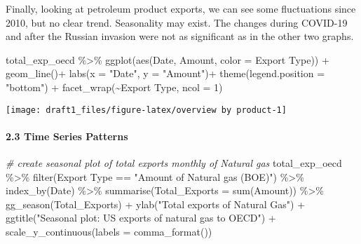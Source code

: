 \documentclass[
]{article}
\newenvironment{Shaded}{\begin{snugshade}}{\end{snugshade}}
\newcommand{\AttributeTok}[1]{\textcolor[rgb]{0.77,0.63,0.00}{#1}}
\newcommand{\CommentTok}[1]{\textcolor[rgb]{0.56,0.35,0.01}{\textit{#1}}}
\newcommand{\DecValTok}[1]{\textcolor[rgb]{0.00,0.00,0.81}{#1}}
\newcommand{\FunctionTok}[1]{\textcolor[rgb]{0.00,0.00,0.00}{#1}}
\newcommand{\NormalTok}[1]{#1}
\newcommand{\SpecialCharTok}[1]{\textcolor[rgb]{0.00,0.00,0.00}{#1}}
\newcommand{\StringTok}[1]{\textcolor[rgb]{0.31,0.60,0.02}{#1}}
\begin{document}
Finally, looking at petroleum product exports, we can see some
fluctuations since 2010, but no clear trend. Seasonality may exist. The
changes during COVID-19 and after the Russian invasion were not as
significant as in the other two graphs.

\begin{Shaded}
\begin{Highlighting}[]
\NormalTok{total\_exp\_oecd }\SpecialCharTok{\%\textgreater{}\%}  
  \FunctionTok{ggplot}\NormalTok{(}\FunctionTok{aes}\NormalTok{(Date, Amount, }\AttributeTok{color =} \StringTok{\textasciigrave{}}\AttributeTok{Export Type}\StringTok{\textasciigrave{}}\NormalTok{)) }\SpecialCharTok{+}
  \FunctionTok{geom\_line}\NormalTok{()}\SpecialCharTok{+}
  \FunctionTok{labs}\NormalTok{(}\AttributeTok{x =} \StringTok{"Date"}\NormalTok{, }\AttributeTok{y =} \StringTok{"Amount"}\NormalTok{)}\SpecialCharTok{+}
  \FunctionTok{theme}\NormalTok{(}\AttributeTok{legend.position =} \StringTok{"bottom"}\NormalTok{) }\SpecialCharTok{+}
  \FunctionTok{facet\_wrap}\NormalTok{(}\SpecialCharTok{\textasciitilde{}}\StringTok{\textasciigrave{}}\AttributeTok{Export Type}\StringTok{\textasciigrave{}}\NormalTok{, }\AttributeTok{ncol =} \DecValTok{1}\NormalTok{)}
\end{Highlighting}
\end{Shaded}

\begin{center}\texttt{[image: draft1\_files/figure-latex/overview by product-1]} \end{center}

\hypertarget{time-series-patterns}{%
\paragraph{2.3 Time Series Patterns}\label{time-series-patterns}}

\begin{Shaded}
\begin{Highlighting}[]
\CommentTok{\# create seasonal plot of total exports monthly of Natural gas}
\NormalTok{total\_exp\_oecd }\SpecialCharTok{\%\textgreater{}\%} \FunctionTok{filter}\NormalTok{(}\StringTok{\textasciigrave{}}\AttributeTok{Export Type}\StringTok{\textasciigrave{}} \SpecialCharTok{==} \StringTok{"Amount of Natural gas (BOE)"}\NormalTok{) }\SpecialCharTok{\%\textgreater{}\%} 
  \FunctionTok{index\_by}\NormalTok{(Date) }\SpecialCharTok{\%\textgreater{}\%} 
  \FunctionTok{summarise}\NormalTok{(}\AttributeTok{Total\_Exports =} \FunctionTok{sum}\NormalTok{(}\StringTok{\textasciigrave{}}\AttributeTok{Amount}\StringTok{\textasciigrave{}}\NormalTok{)) }\SpecialCharTok{\%\textgreater{}\%} 
  \FunctionTok{gg\_season}\NormalTok{(Total\_Exports) }\SpecialCharTok{+}
  \FunctionTok{ylab}\NormalTok{(}\StringTok{"Total exports  of Natural Gas"}\NormalTok{) }\SpecialCharTok{+}
  \FunctionTok{ggtitle}\NormalTok{(}\StringTok{"Seasonal plot: US exports of natural gas to OECD"}\NormalTok{) }\SpecialCharTok{+}
  \FunctionTok{scale\_y\_continuous}\NormalTok{(}\AttributeTok{labels =} \FunctionTok{comma\_format}\NormalTok{())}
\end{Highlighting}
\end{Shaded}
\end{document}
